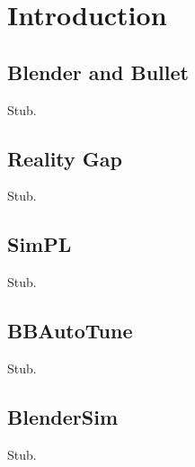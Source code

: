 \chapter{Introduction}

\label{Chapter1}


\section{Blender and Bullet}

Stub.

\section{Reality Gap}

Stub.

\section{SimPL}

Stub.

\section{BBAutoTune}

Stub.

\section{BlenderSim}

Stub.
